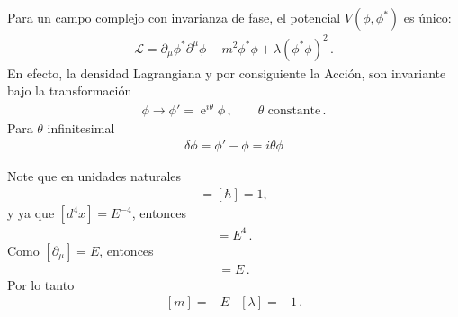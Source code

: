 Para un campo complejo con invarianza de fase, el potencial $V(\phi,\phi^{*})$ es único:
\begin{align}
\label{eq:cef}
  \mathcal{L}=\partial_{\mu}\phi^{*} \partial^{\mu}\phi-m^2\phi^{*}\phi+\lambda \left(\phi^{*}\phi \right)^2\,.
\end{align}
En efecto, la densidad Lagrangiana y por consiguiente la Acción, son invariante bajo la transformación
\begin{align}
  \phi\to \phi'=\operatorname{e}^{i\theta}\phi\,,\qquad \text{$\theta$ constante}\,.
\end{align}
Para $\theta$ infinitesimal
\begin{align}
\label{eq:deltaphi}
  \delta\phi=\phi'-\phi=i\theta\phi
\end{align}



Note que en unidades naturales
\begin{align}
  [S]=[\hbar]=1,
\end{align}
y ya que $[d^4x]=E^{-4}$, entonces
\begin{align}
  [\mathcal{L}]=E^{4}\,.
\end{align}
Como $[\partial_{\mu}]=E$, entonces
\begin{align}
  [\phi]=E\,.
\end{align}
Por lo tanto
\begin{align}
  \left[ m \right]=&E& \left[ \lambda \right]=&1\,.
\end{align}


